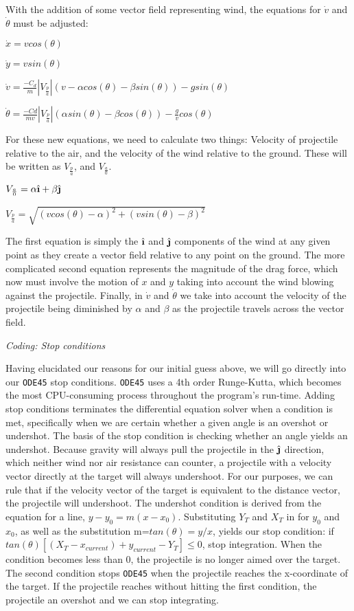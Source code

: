 \documentclass[12pt]{article}
\newcommand{\ihat}{\hat{\textbf{\i}}}
\newcommand{\jhat}{\hat{\textbf{\j}}}
\begin{document}
\begin{enumerate}
\normalsize{With the addition of some vector field representing wind, the equations for $\dot{v}$ and $\dot{\theta}$ must be adjusted:\newline

\centerline{$\dot{x} = vcos(\theta)$}
\centerline{$\dot{y} = vsin(\theta)$}
\centerline{$\dot{v} = \frac{-C_d}{m}|V_{\frac{p}{a}}|(v-\alpha cos(\theta)-\beta sin(\theta)) - gsin(\theta)$}
\centerline{$\dot{\theta} =\frac{-Cd}{mv}|V_{\frac{p}{a}}|(\alpha sin(\theta)-\beta cos(\theta))-\frac{g}{v}cos(\theta)$}

For these new equations, we need to calculate two things: Velocity of projectile relative to the air, and the velocity of the wind relative to the ground.  These will be written as $V_{\frac{p}{a}}$, and $V_{\frac{a}{0}}$.  

\centerline{$V_{\frac{a}{0}} = \alpha \ihat + \beta \jhat$}
\centerline{$V_{\frac{p}{a}} = \sqrt{(vcos(\theta) - \alpha)^2 + (vsin(\theta) - \beta)^2}$}

The first equation is simply the $\ihat$ and $\jhat$ components of the wind at any given point as they create a vector field relative to any point on the ground.  The more complicated second equation represents the magnitude of the drag force, which now must involve the motion of $x$ and $y$ taking into account the wind blowing against the projectile. Finally, in $\dot{v}$ and $\dot{\theta}$ we take into account the velocity of the projectile being diminished by $\alpha$ and $\beta$ as the projectile travels across the vector field.}

\newpage
\large{\item\textit{Coding: Stop conditions}}

\normalsize{Having elucidated our reasons for our initial guess above, we will go directly into our \texttt{ODE45} stop conditions. \texttt{ODE45} uses a 4th order Runge-Kutta, which becomes the most CPU-consuming process throughout the program's run-time. Adding stop conditions terminates the differential equation solver when a condition is met, specifically when we are certain whether a given angle is an overshot or undershot. The basis of the stop condition is checking whether an angle yields an undershot. Because gravity will always pull the projectile in the $\jhat$ direction, which neither wind nor air resistance can counter, a projectile with a velocity vector directly at the target will always undershoot. For our purposes, we can rule that if the velocity vector of the target is equivalent to the distance vector, the projectile will undershoot. The undershot condition is derived from the equation for a line, $y-y_0=m(x-x_0)$.  Substituting $Y_T$ and $X_T$ in for $y_0$ and $x_0$, as well as the substitution m=$tan(\theta) = y/x$, yields our stop condition: if $ tan(\theta)[(X_T-x_{current})+y_{current}-Y_T] \leq 0$, stop integration. When the condition becomes less than 0, the projectile is no longer aimed over the target. The second condition stops \texttt{ODE45} when the projectile reaches the x-coordinate of the target. If the projectile reaches without hitting the first condition, the projectile an overshot and we can stop integrating.

}
\end{enumerate}
\end{document}
